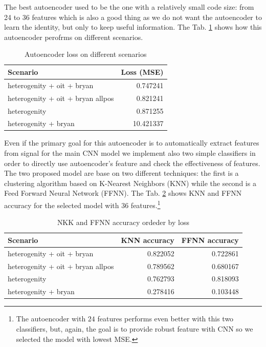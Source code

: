 The best autoencoder used to be the one with a relatively small code
size: from 24 to 36 features which is also a good thing as we do not
want the autoencoder to learn the identity, but only to keep useful
information. The Tab. \ref{tab:ae-loss} shows how this autoencoder
perofrms on different scenarios.
\begin{table}
  \centering
  \begin{tabular}{lr}
    \hline
    Scenario & Loss (MSE) \\
    \hline
    heterogenity + oit + bryan & 0.747241 \\
    heterogenity + oit + bryan allpos & 0.821241 \\
    heterogenity & 0.871255 \\
    heterogenity + bryan & 10.421337 \\
    \hline
  \end{tabular}
  \caption{Autoencoder loss on different scenarios}
  \label{tab:ae-loss}
\end{table}

Even if the primary goal for this autoencoder is to automatically
extract features from signal for the main CNN model we implement also
two simple classifiers in order to directly use autoencoder's feature
and check the effectiveness of features. The two proposed model are
base on two different techniques: the first is a clustering algorithm
based on K-Nearest Neighbors (KNN) while the second is a Feed Forward
Neural Network (FFNN). The Tab. \ref{tab:ae-classifiers-accuracy}
shows KNN and FFNN accuracy for the selected model with $36$
features.\footnote{The autoencoder with $24$ features performs even
  better with this two classifiers, but, again, the goal is to provide
  robust feature with CNN so we selected the model with lowest MSE.}
\begin{table}
  \centering
  \begin{tabular}{p{3cm}rr}
    \hline
    Scenario & KNN accuracy & FFNN accuracy \\
    \hline
    heterogenity + oit + bryan & 0.822052  & 0.722861 \\
    heterogenity + oit + bryan allpos &  0.789562 & 0.680167 \\
    heterogenity & 0.762793 & 0.818093 \\
    heterogenity + bryan & 0.278416 & 0.103448 \\
    \hline
  \end{tabular}
  \caption{NKK and FFNN accuracy ordeder by loss}
  \label{tab:ae-classifiers-accuracy}
\end{table}

